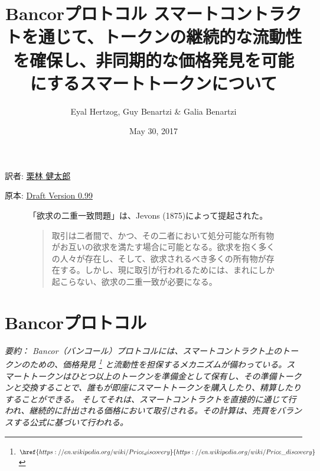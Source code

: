 \documentclass{jsarticle}
\begin{document}
\title{
  \textbf{Bancorプロトコル}
  \protect\linebreak
  \protect\linebreak
  \large
  スマートコントラクトを通じて、トークンの継続的な流動性を確保し、非同期的な価格発見を可能にするスマートトークンについて
}

\author{Eyal Hertzog, Guy Benartzi \& Galia Benartzi}
\date{May 30, 2017}

\maketitle

\begin{center}
  \item[訳者:] \href{https://kentarok.org}{栗林 健太郎}
  \item[原本:] \href{http://www.hyuki.com/girl/}{Draft Version 0.99}
\end{center}

\begin{figure}[b]
  「欲求の二重一致問題」は、Jevons (1875)によって提起された。

  \begin{quotation}  
    取引は二者間で、かつ、その二者において処分可能な所有物がお互いの欲求を満たす場合に可能となる。欲求を抱く多くの人々が存在し、そして、欲求されるべき多くの所有物が存在する。しかし、現に取引が行われるためには、まれにしか起こらない、欲求の二重一致が必要になる。
  \end{quotation}
\end{figure}

\newpage
\tableofcontents
\newpage

\section{Bancorプロトコル}

\emph{
  要約： Bancor（バンコール）プロトコルには、スマートコントラクト上のトークンのための、価格発見
  \footnote{
    $\href{
      https://en.wikipedia.org/wiki/Price_discovery
    }{
      https://en.wikipedia.org/wiki/Price\_discovery
    }$
  }
  と流動性を担保するメカニズムが備わっている。スマートトークンはひとつ以上のトークンを準備金として保有し、その準備トークンと交換することで、誰もが即座にスマートトークンを購入したり、精算したりすることができる。 そしてそれは、スマートコントラクトを直接的に通じて行われ、継続的に計出される価格において取引される。その計算は、売買をバランスする公式に基づいて行われる。
} \\
\end{document}
